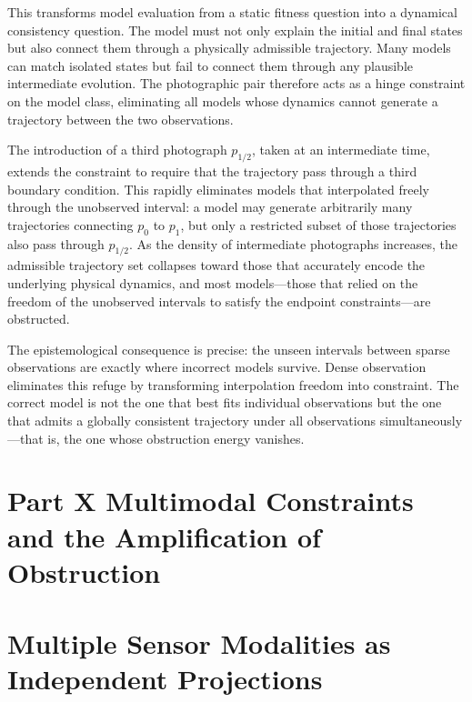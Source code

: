 \documentclass[12pt, a4paper, oneside]{article}
\theoremstyle{plain}
\theoremstyle{definition}
\theoremstyle{remark}
\begin{document}
This transforms model evaluation from a static fitness question into a dynamical consistency question. The model must not only explain the initial and final states but also connect them through a physically admissible trajectory. Many models can match isolated states but fail to connect them through any plausible intermediate evolution. The photographic pair therefore acts as a hinge constraint on the model class, eliminating all models whose dynamics cannot generate a trajectory between the two observations.

The introduction of a third photograph $p_{1/2}$, taken at an intermediate time, extends the constraint to require that the trajectory pass through a third boundary condition. This rapidly eliminates models that interpolated freely through the unobserved interval: a model may generate arbitrarily many trajectories connecting $p_0$ to $p_1$, but only a restricted subset of those trajectories also pass through $p_{1/2}$. As the density of intermediate photographs increases, the admissible trajectory set collapses toward those that accurately encode the underlying physical dynamics, and most models---those that relied on the freedom of the unobserved intervals to satisfy the endpoint constraints---are obstructed.

The epistemological consequence is precise: the unseen intervals between sparse observations are exactly where incorrect models survive. Dense observation eliminates this refuge by transforming interpolation freedom into constraint. The correct model is not the one that best fits individual observations but the one that admits a globally consistent trajectory under all observations simultaneously---that is, the one whose obstruction energy vanishes.

\section*{Part X \quad Multimodal Constraints and the Amplification of Obstruction}

\setcounter{section}{49}

\section{Multiple Sensor Modalities as Independent Projections}
\end{document}
